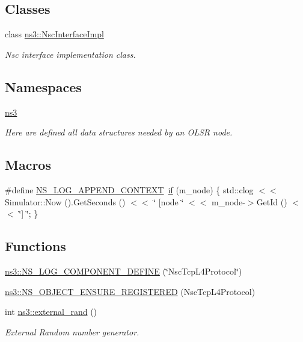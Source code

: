 \subsection*{Classes}
\begin{DoxyCompactItemize}
\item 
class \hyperlink{classns3_1_1NscInterfaceImpl}{ns3\+::\+Nsc\+Interface\+Impl}
\begin{DoxyCompactList}\small\item\em Nsc interface implementation class. \end{DoxyCompactList}\end{DoxyCompactItemize}
\subsection*{Namespaces}
\begin{DoxyCompactItemize}
\item 
 \hyperlink{namespacens3}{ns3}
\begin{DoxyCompactList}\small\item\em Here are defined all data structures needed by an O\+L\+SR node. \end{DoxyCompactList}\end{DoxyCompactItemize}
\subsection*{Macros}
\begin{DoxyCompactItemize}
\item 
\#define \hyperlink{nsc-tcp-l4-protocol_8cc_abe50035652d407c40bdaef78214c4955}{N\+S\+\_\+\+L\+O\+G\+\_\+\+A\+P\+P\+E\+N\+D\+\_\+\+C\+O\+N\+T\+E\+XT}~\hyperlink{loss__OH__large__cities__urban_8m_ac77b6cfa3068152087725fe54b4ae8c8}{if} (m\+\_\+node) \{ std\+::clog $<$$<$ Simulator\+::\+Now ().Get\+Seconds () $<$$<$ \char`\"{} \mbox{[}node \char`\"{} $<$$<$ m\+\_\+node-\/$>$Get\+Id () $<$$<$ \char`\"{}\mbox{]} \char`\"{}; \}
\end{DoxyCompactItemize}
\subsection*{Functions}
\begin{DoxyCompactItemize}
\item 
\hyperlink{namespacens3_a93bf6c62c6161f440f733cc6cd0a7060}{ns3\+::\+N\+S\+\_\+\+L\+O\+G\+\_\+\+C\+O\+M\+P\+O\+N\+E\+N\+T\+\_\+\+D\+E\+F\+I\+NE} (\char`\"{}Nsc\+Tcp\+L4\+Protocol\char`\"{})
\item 
\hyperlink{namespacens3_af73db16e020da56db3b5f2416939d92e}{ns3\+::\+N\+S\+\_\+\+O\+B\+J\+E\+C\+T\+\_\+\+E\+N\+S\+U\+R\+E\+\_\+\+R\+E\+G\+I\+S\+T\+E\+R\+ED} (Nsc\+Tcp\+L4\+Protocol)
\item 
int \hyperlink{namespacens3_a1a6b8401da47f969f052f57371529beb}{ns3\+::external\+\_\+rand} ()
\begin{DoxyCompactList}\small\item\em External Random number generator. \end{DoxyCompactList}\end{DoxyCompactItemize}


